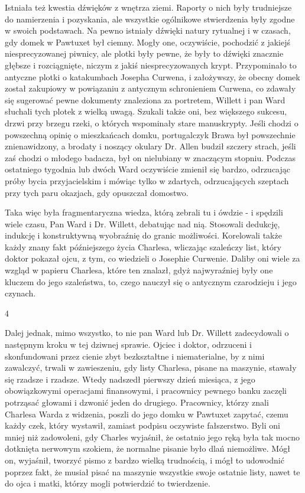 Istniała też kwestia dźwięków z wnętrza ziemi. Raporty o nich były trudniejsze do namierzenia i pozyskania, ale wszystkie ogólnikowe stwierdzenia były zgodne w swoich podstawach. Na pewno istniały dźwięki natury rytualnej i w czasach, gdy domek w Pawtuxet był ciemny. Mogły one, oczywiście, pochodzić z jakiejś niesprecyzowanej piwnicy, ale plotki były pewne, że były to dźwięki znacznie głębsze i rozciągnięte, niczym z jakiś niesprecyzowanych krypt. Przypominało to antyczne plotki o katakumbach Josepha Curwena, i założywszy, że obecny domek został zakupiowy w powiązaniu z antycznym schronieniem Curwena, co zdawały się sugerować pewne dokumenty znaleziona za portretem, Willett i pan Ward słuchali tych plotek z wielką uwagą. Szukali także oni, bez większego sukcesu, drzwi przy brzegu rzeki, o których wspominały stare manuskrypty. Jeśli chodzi o powszechną opinię o mieszkańcach domku, portugalczyk Brawa był powszechnie znienawidzony, a brodaty i noszący okulary Dr. Allen budził szczery strach, jeśli zaś chodzi o młodego badacza, był on nielubiany w znaczącym stopniu. Podczas ostatniego tygodnia lub dwóch Ward oczywiście zmienił się bardzo, odrzucając próby bycia przyjacielskim i mówiąc tylko w zdartych, odrzucających szeptach przy tych paru okazjach, gdy opuszczał domostwo. 

Taka więc była fragmentaryczna wiedza, którą zebrali tu i ówdzie - i spędzili wiele czasu, Pan Ward i Dr. Willett, debatując nad nią. Stosowali dedukcję, indukcję i konstruktywną wyobraźnię do granic możliwości. Korelowali także każdy znany fakt późniejszego życia Charlesa, wliczając szaleńczy list, który doktor pokazał ojcu, z tym, co wiedzieli o Josephie Curwenie. Daliby oni wiele za wzgląd w papieru Charlesa, które ten znalazł, gdyż najwyraźniej były one kluczem do jego szaleństwa, to, czego nauczył się o antycznym czarodzieju i jego czynach.

\begin{center}
4
\end{center}

Dalej jednak, mimo wszystko, to nie pan Ward lub Dr. Willett zadecydowali o następnym kroku w tej dziwnej sprawie. Ojciec i doktor, odrzuceni i skonfundowani przez cienie zbyt bezkształtne i niematerialne, by z nimi zawalczyć, trwali w zawieszeniu, gdy listy Charlesa, pisane na maszynie, stawały się rzadsze i rzadsze. Wtedy nadszedł pierwszy dzień miesiąca, z jego obowiązkowymi operacjami finansowymi, i pracownicy pewnego banku zaczęli potrząsać głowami i dzwonić jeden do drugiego. Pracownicy, którzy znali Charlesa Warda z widzenia, poszli do jego domku w Pawtuxet zapytać, czemu każdy czek, który wystawił, zamiast podpisu oczywiste fałszerstwo. Byli oni mniej niż zadowoleni, gdy Charles wyjaśnił, że ostatnio jego ręką była tak mocno dotknięta nerwowym szokiem, że normalne pisanie było dlań niemożliwe. Mógł on, wyjaśnił, tworzyć pismo z bardzo wielką trudnością, i mógł to udowodnić poprzez fakt, że musiał pisać na maszynie wszystkie swoje ostatnie listy, nawet te do ojca i matki, którzy mogli potwierdzić to twierdzenie. 

